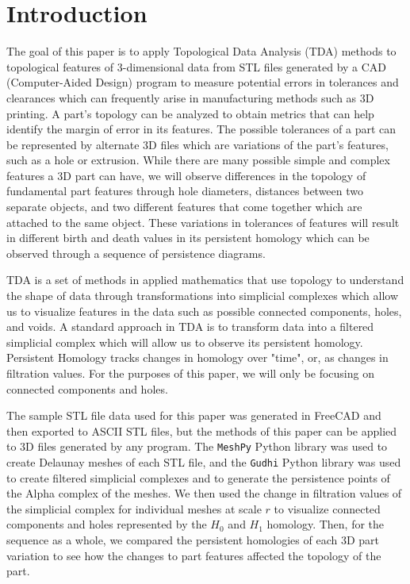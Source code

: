 \documentclass[ma]{uncgdissertationexp}
\theoremstyle{plain}
\theoremstyle{definition}
\theoremstyle{remark}
\begin{document}
\chapter{Introduction}

\par The goal of this paper is to apply Topological Data Analysis (TDA) methods to topological features of 3-dimensional data from STL files generated by a CAD (Computer-Aided Design) program to measure potential errors in tolerances and clearances which can frequently arise in manufacturing methods such as 3D printing. A part's topology can be analyzed to obtain metrics that can help identify the margin of error in its features. The possible tolerances of a part can be represented by alternate 3D files which are variations of the part's features, such as a hole or extrusion. While there are many possible simple and complex features a 3D part can have, we will observe differences in the topology of fundamental part features through hole diameters, distances between two separate objects, and two different features that come together which are attached to the same object. These variations in tolerances of features will result in different birth and death values in its persistent homology which can be observed through a sequence of persistence diagrams.
\par TDA is a set of methods in applied mathematics that use topology to understand the shape of data through transformations into simplicial complexes which allow us to visualize features in the data such as possible connected components, holes, and voids. A standard approach in TDA is to transform data into a filtered simplicial complex which will allow us to observe its persistent homology. Persistent Homology tracks changes in homology over "time", or, as changes in filtration values. For the purposes of this paper, we will only be focusing on connected components and holes. 
\par The sample STL file data used for this paper was generated in FreeCAD and then exported to ASCII STL files, but the methods of this paper can be applied to 3D files generated by any program. The \verb"MeshPy" Python library was used to create Delaunay meshes of each STL file, and the \verb"Gudhi" Python library was used to create filtered simplicial complexes and to generate the persistence points of the Alpha complex of the meshes. We then used the change in filtration values of the simplicial complex for individual meshes at scale $r$ to visualize connected components and holes represented by the $H_0$ and $H_1$ homology. Then, for the sequence as a whole, we compared the persistent homologies of each 3D part variation to see how the changes to part features affected the topology of the part.
\end{document}
